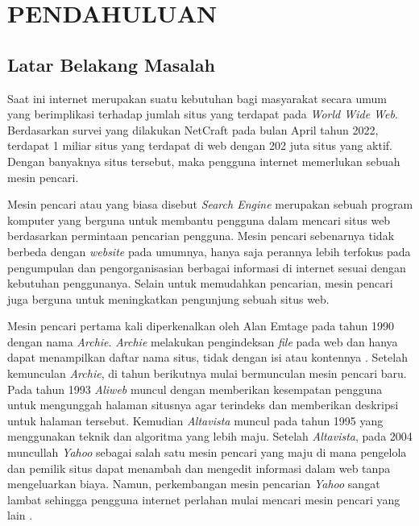 
\chapter{PENDAHULUAN}

\section{Latar Belakang Masalah}

Saat ini internet merupakan suatu kebutuhan bagi masyarakat secara umum yang berimplikasi terhadap jumlah situs yang terdapat pada \textit{World Wide Web}. Berdasarkan survei yang dilakukan NetCraft pada bulan April tahun 2022, terdapat 1 miliar situs yang terdapat di web dengan 202 juta situs yang aktif. Dengan banyaknya situs tersebut, maka pengguna internet memerlukan sebuah mesin pencari.

Mesin pencari atau yang biasa disebut \emph{Search Engine} merupakan sebuah program komputer yang berguna untuk membantu pengguna dalam mencari situs web berdasarkan permintaan pencarian pengguna. Mesin pencari sebenarnya tidak berbeda dengan \textit{website} pada umumnya, hanya saja perannya lebih terfokus pada pengumpulan dan pengorganisasian berbagai informasi di internet sesuai dengan kebutuhan penggunanya. Selain untuk memudahkan pencarian, mesin pencari juga berguna untuk meningkatkan pengunjung sebuah situs web.

Mesin pencari pertama kali diperkenalkan oleh Alan Emtage pada tahun 1990 dengan nama \textit{Archie}. \textit{Archie} melakukan pengindeksan \textit{file} pada web dan hanya dapat menampilkan daftar nama situs, tidak dengan isi atau kontennya \citep{seymour2011history}. Setelah kemunculan \textit{Archie}, di tahun berikutnya mulai bermunculan mesin pencari baru. Pada tahun 1993 \textit{Aliweb} muncul dengan memberikan kesempatan pengguna untuk mengunggah halaman situsnya agar terindeks dan memberikan deskripsi untuk halaman tersebut. Kemudian \textit{Altavista} muncul pada tahun 1995 yang menggunakan teknik dan algoritma yang lebih maju. Setelah \textit{Altavista}, pada 2004 muncullah \textit{Yahoo} sebagai salah satu mesin pencari yang maju di mana pengelola dan pemilik situs dapat menambah dan mengedit informasi dalam web tanpa mengeluarkan biaya. Namun, perkembangan mesin pencarian \textit{Yahoo} sangat lambat sehingga pengguna internet perlahan mulai mencari mesin pencari yang lain \citep{seymour2011history}.

